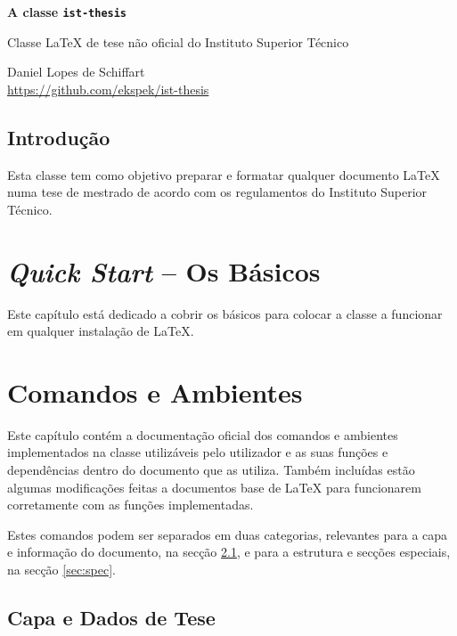 \documentclass{../ist-thesis}
\begin{document}
\begin{center}
	{\Huge\bfseries A classe \texttt{ist-thesis}}
	\par\bigskip
	{\Large Classe LaTeX de tese não oficial do Instituto Superior Técnico}
	\par\bigskip\smallskip
	Daniel Lopes de Schiffart \\
	\url{https://github.com/ekspek/ist-thesis}
\end{center}

\bigskip\bigskip

\begin{center}
	\section*{Introdução}
\end{center}
Esta classe tem como objetivo preparar e formatar qualquer documento \LaTeX{} numa tese de mestrado de acordo com os regulamentos do Instituto Superior Técnico.

\tableofcontents

\clearpage

\chapter{\textit{Quick Start} -- Os Básicos}

Este capítulo está dedicado a cobrir os básicos para colocar a classe a funcionar em qualquer instalação de \LaTeX{}.

\chapter{Comandos e Ambientes}

Este capítulo contém a documentação oficial dos comandos e ambientes implementados na classe utilizáveis pelo utilizador e as suas funções e dependências dentro do documento que as utiliza. Também incluídas estão algumas modificações feitas a documentos base de \LaTeX{} para funcionarem corretamente com as funções implementadas.

Estes comandos podem ser separados em duas categorias, relevantes para a capa e informação do documento, na secção \ref{sec:metadata}, e para a estrutura e secções especiais, na secção \ref{sec:spec}.

\section{Capa e Dados de Tese}\label{sec:metadata}
\end{document}
